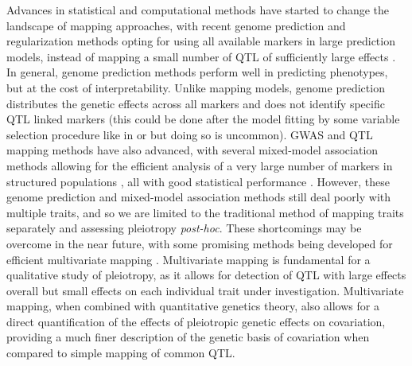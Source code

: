 \begin{refsection}
Advances in statistical and computational methods have started to change the
landscape of mapping approaches, with recent genome prediction and
regularization methods opting for using all available markers in large
prediction models, instead of mapping a small number of QTL of sufficiently
large effects \parencite{Meuwissen2001-cu,De_Los_Campos2013-gn}. In general,
genome prediction methods perform well in predicting phenotypes, but at the
cost of interpretability. Unlike mapping models, genome prediction distributes
the genetic effects across all markers and does not identify specific QTL
linked markers (this could be done after the model fitting by some variable
selection procedure like in \textcite{Piironen2015-ai} or
\textcite{Moser2015-sm}  but doing so is uncommon). GWAS and QTL mapping
methods have also advanced, with several mixed-model association methods
allowing for the efficient analysis of a very large number of markers in
structured populations \parencite{Lipka2012-tf,Zhou2012-zl,Lippert2011-jn} ,
all with good statistical performance \parencite{Eu-Ahsunthornwattana2014-fn}.
However, these genome prediction and mixed-model association methods still
deal poorly with multiple traits, and so we are limited to the traditional
method of mapping traits separately and assessing pleiotropy \emph{post-hoc}.
These shortcomings may be overcome in the near future, with some promising
methods being developed for efficient multivariate mapping
\parencite{Pitchers2017-ge,Hannah2018-zh,Kemper2018-gi}. Multivariate mapping
is fundamental for a qualitative study of pleiotropy, as it allows for
detection of QTL with large effects overall but small effects on each
individual trait under investigation. Multivariate mapping, when combined with
quantitative genetics theory, also allows for a direct quantification of the
effects of pleiotropic genetic effects on covariation, providing a much finer
description of the genetic basis  of covariation when compared to simple
mapping of common QTL.


\end{refsection}
